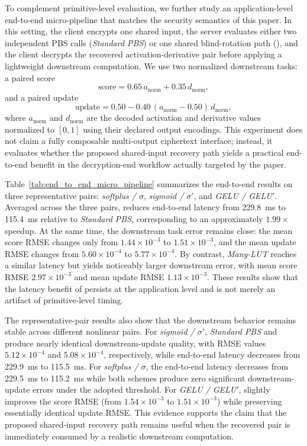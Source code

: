 To complement primitive-level evaluation, we further study an application-level end-to-end micro-pipeline that matches the security semantics of this paper. In this setting, the client encrypts one shared input, the server evaluates either two independent PBS calls (\emph{Standard PBS}) or one shared blind-rotation path (\emph{\SDRPBS}), and the client decrypts the recovered activation-derivative pair before applying a lightweight downstream computation. We use two normalized downstream tasks: a paired score
\[
\mathrm{score}=0.65\,a_{\mathrm{norm}}+0.35\,d_{\mathrm{norm}},
\]
and a paired update
\[
\mathrm{update}=0.50-0.40\,(a_{\mathrm{norm}}-0.50)\,d_{\mathrm{norm}},
\]
where $a_{\mathrm{norm}}$ and $d_{\mathrm{norm}}$ are the decoded activation and derivative values normalized to $[0,1]$ using their declared output encodings. This experiment does not claim a fully composable multi-output ciphertext interface; instead, it evaluates whether the proposed shared-input recovery path yields a practical end-to-end benefit in the decryption-end workflow actually targeted by the paper.

Table~\ref{tab:end_to_end_micro_pipeline} summarizes the end-to-end results on three representative pairs: \emph{softplus / $\sigma$}, \emph{sigmoid / $\sigma'$}, and \emph{GELU / GELU$'$}. Averaged across the three pairs, \emph{\SDRPBS} reduces end-to-end latency from 229.8~ms to 115.4~ms relative to \emph{Standard PBS}, corresponding to an approximately $1.99\times$ speedup. At the same time, the downstream task error remains close: the mean score RMSE changes only from $1.44\times 10^{-3}$ to $1.51\times 10^{-3}$, and the mean update RMSE changes from $5.60\times 10^{-4}$ to $5.77\times 10^{-4}$. By contrast, \emph{Many-LUT} reaches a similar latency but yields noticeably larger downstream error, with mean score RMSE $2.97\times 10^{-3}$ and mean update RMSE $1.13\times 10^{-3}$. These results show that the latency benefit of \SDRPBS persists at the application level and is not merely an artifact of primitive-level timing.

The representative-pair results also show that the downstream behavior remains stable across different nonlinear pairs. For \emph{sigmoid / $\sigma'$}, \emph{Standard PBS} and \emph{\SDRPBS} produce nearly identical downstream-update quality, with RMSE values $5.12\times10^{-4}$ and $5.08\times10^{-4}$, respectively, while end-to-end latency decreases from 229.9~ms to 115.5~ms. For \emph{softplus / $\sigma$}, the end-to-end latency decreases from 229.5~ms to 115.2~ms while both schemes produce zero significant downstream-update errors under the adopted threshold. For \emph{GELU / GELU$'$}, \emph{\SDRPBS} slightly improves the score RMSE (from $1.54\times10^{-3}$ to $1.51\times10^{-3}$) while preserving essentially identical update RMSE. This evidence supports the claim that the proposed shared-input recovery path remains useful when the recovered pair is immediately consumed by a realistic downstream computation.

